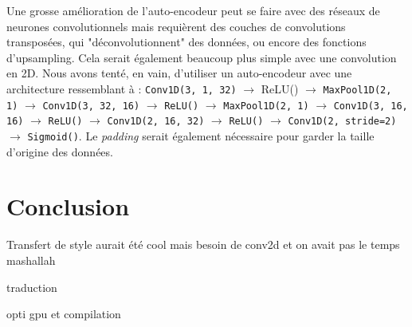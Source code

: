 \documentclass{article}
\begin{document}
Une grosse amélioration de l'auto-encodeur peut se faire avec des réseaux de neurones convolutionnels mais requièrent des couches de convolutions transposées, qui "déconvolutionnent" des données, ou encore des fonctions d'upsampling. Cela serait également beaucoup plus simple avec une convolution en 2D. Nous avons tenté, en vain, d'utiliser un auto-encodeur avec une architecture ressemblant à : \texttt{Conv1D(3, 1, 32)} $\rightarrow$ {ReLU()} $\rightarrow$ \texttt{MaxPool1D(2, 1)} $\rightarrow$ \texttt{Conv1D(3, 32, 16)} $\rightarrow$ \texttt{ReLU()} $\rightarrow$ \texttt{MaxPool1D(2, 1)} $\rightarrow$ \texttt{Conv1D(3, 16, 16)} $\rightarrow$ \texttt{ReLU()} $\rightarrow$ \texttt{Conv1D(2, 16, 32)} $\rightarrow$ \texttt{ReLU()} $\rightarrow$ \texttt{Conv1D(2, stride=2)} $\rightarrow$ \texttt{Sigmoid()}. Le \textit{padding} serait également nécessaire pour garder la taille d'origine des données.


\section{Conclusion}

Transfert de style aurait été cool mais besoin de conv2d et on avait pas le temps mashallah

traduction 

opti gpu et compilation 
\end{document}
